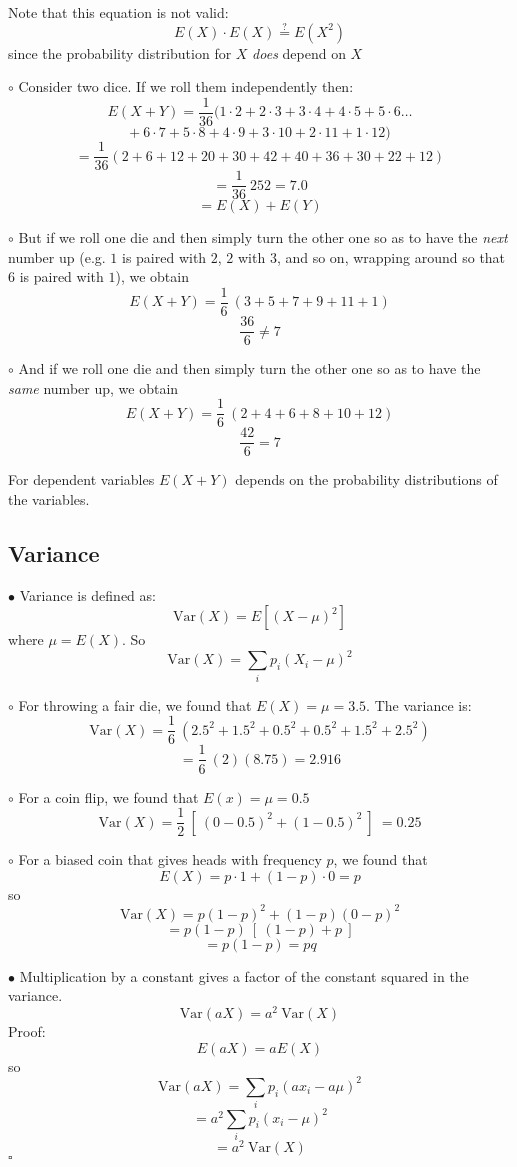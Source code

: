 \documentclass[11pt, oneside]{article}   	%
\begin{document}
Note that this equation is not valid:
\[ E(X) \cdot E(X) \stackrel{?}{=} E(X^2) \]
since the probability distribution for $X$ \emph{does} depend on $X$

$\circ$ Consider two dice.  If we roll them independently then:
\[ E(X + Y) = \frac{1}{36} (1 \cdot 2 + 2 \cdot 3 + 3 \cdot 4 + 4 \cdot 5 + 5 \cdot 6 \dots \]
\[ + \ 6 \cdot 7 + 5 \cdot 8 + 4 \cdot 9 + 3 \cdot 10 + 2 \cdot 11 + 1 \cdot 12) \]
\[ =  \frac{1}{36} (2 + 6 + 12 + 20 + 30 + 42 + 40 + 36 + 30 + 22 + 12) \]
\[ = \frac{1}{36} \ 252 = 7.0 \]
\[ = E(X) + E(Y) \]

$\circ$ But if we roll one die and then simply turn the other one so as to have the \emph{next} number up (e.g. $1$ is paired with $2$, $2$ with $3$, and so on, wrapping around so that $6$ is paired with $1$), we obtain
\[ E(X + Y) = \frac{1}{6} \ (3 + 5 + 7 + 9 + 11 + 1) \] 
\[ \frac{36}{6} \ne 7 \]

$\circ$ And if we roll one die and then simply turn the other one so as to have the \emph{same} number up, we obtain
\[ E(X + Y) = \frac{1}{6} \ (2 + 4 + 6 + 8 + 10 + 12) \] 
\[ \frac{42}{6} = 7 \]

For dependent variables $E(X+Y)$ depends on the probability distributions of the variables.

\subsection*{Variance}
$\bullet$ Variance is defined as:
\[ \text{Var}(X) = E[(X - \mu)^2 ] \]
where $\mu = E(X)$.  So
\[ \text{Var}(X) = \sum_i p_i (X_i - \mu)^2 \]

$\circ$ For throwing a fair die, we found that $E(X) = \mu = 3.5$.  The variance is:
\[ \text{Var}(X) = \frac{1}{6} \ (2.5^2 + 1.5^2 + 0.5^2 + 0.5^2 + 1.5^2 + 2.5^2) \]
\[ = \frac{1}{6} \ (2) (8.75) = 2.916 \]

$\circ$ For a coin flip, we found that $E(x) = \mu = 0.5$ 
\[ \text{Var}(X) = \frac{1}{2} \ [ \ (0-0.5)^2 + (1-0.5)^2 \ ] \  = 0.25 \]

$\circ$ For a biased coin that gives heads with frequency $p$, we found that
\[ E(X) = p \cdot 1 + (1-p) \cdot 0 = p \]
so
\[ \text{Var}(X) = p (1-p)^2 + (1-p)(0 - p)^2 \]
\[ = p(1-p) \ [ \ (1-p) + p \ ] \]
\[ = p(1-p) = pq \]

$\bullet$ Multiplication by a constant gives a factor of the constant squared in the variance.
\[ \text{Var}(aX) = a^2 \ \text{Var}(X) \]
Proof:
\[ E(aX) = aE(X) \]
so
\[ \text{Var}(aX) = \sum_i p_i (ax_i - a \mu)^2 \]
\[ = a^2  \sum_i p_i (x_i - \mu)^2 \]
\[ = a^2 \ \text{Var}(X) \]
$\square$
\end{document}
